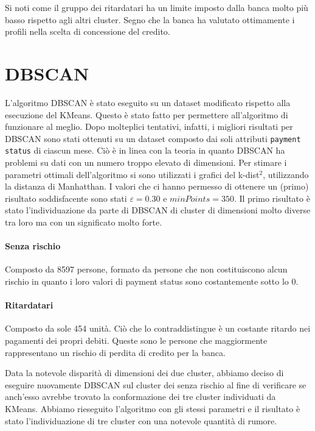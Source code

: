 Si noti come il gruppo dei ritardatari ha un limite imposto dalla banca molto pi\`u basso rispetto agli altri cluster. Segno che la banca ha valutato ottimamente i profili nella scelta di concessione del credito.

\section{DBSCAN}L'algoritmo DBSCAN \`e stato eseguito su un dataset
modificato rispetto alla esecuzione del KMeans.
Questo \`e stato fatto per permettere all'algoritmo
di funzionare al meglio. Dopo molteplici tentativi,
infatti, i migliori risultati per DBSCAN sono stati ottenuti
su un dataset composto dai soli attributi 
\texttt{payment status} di ciascun mese. Ci\`o \`e in linea
con la teoria in quanto DBSCAN ha problemi su dati con un 
numero troppo elevato di dimensioni.
Per stimare i parametri ottimali dell'algoritmo si sono
utilizzati i grafici del k-dist$^2$, utilizzando la 
distanza di Manhatthan. I valori che ci hanno permesso di
ottenere un (primo) risultato soddisfacente sono stati
$\varepsilon=0.30$ e $minPoints=350$.
Il primo risultato \`e stato l'individuazione da parte
di DBSCAN di cluster di dimensioni molto diverse tra loro
ma con un significato molto forte.

\paragraph{Senza rischio}
Composto da 8597 persone, formato da persone che non
costituiscono alcun rischio in quanto i loro valori 
di payment status sono costantemente sotto lo 0.

\paragraph{Ritardatari}
Composto da sole 454 unit\`a. Ci\`o che lo contraddistingue
\`e un costante ritardo nei pagamenti dei propri debiti.
Queste sono le persone che maggiormente rappresentano
un rischio di perdita di credito per la banca.

Data la notevole disparit\`a di dimensioni dei due cluster, 
abbiamo deciso di eseguire nuovamente DBSCAN sul cluster
dei senza rischio al fine di verificare se anch'esso avrebbe
trovato la conformazione dei tre cluster individuati da KMeans.
Abbiamo rieseguito l'algoritmo con gli stessi parametri e il
risultato \`e stato l'individuazione di tre cluster con una 
notevole quantit\`a di rumore. 

